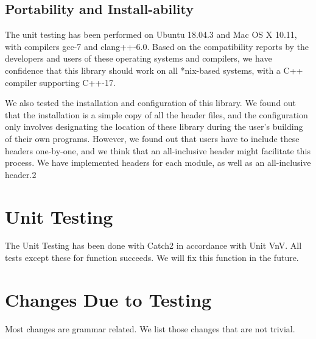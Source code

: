 \documentclass[12pt, titlepage]{article}
\begin{document}
\subsection{Portability and Install-ability}
The unit testing has been performed on Ubuntu 18.04.3 and Mac OS X 10.11, with compilers gcc-7 and clang++-6.0. Based on the compatibility reports by the developers and users of these operating systems and compilers, we have confidence that this library should work on all *nix-based systems, with a C++ compiler supporting C++-17.

We also tested the installation and configuration of this library. We found out that the installation is a simple copy of all the header files, and the configuration only involves designating the location of these library during the user's building of their own programs. However, we found out that users have to include these headers one-by-one, and we think that an all-inclusive header might facilitate this process. We have implemented headers for each module, as well as an all-inclusive header.2

\section{Unit Testing}
The Unit Testing has been done with Catch2 in accordance with Unit VnV. All tests except these for function  succeeds. We will fix this function in the future.

\section{Changes Due to Testing}
Most changes are grammar related. We list those changes that are not trivial.
\end{document}
